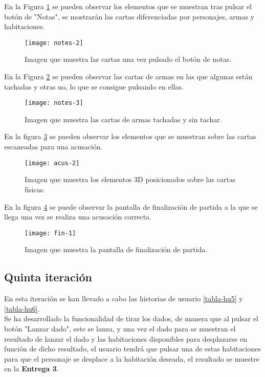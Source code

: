 \newpage

En la Figura \ref{figura-notas-1} se pueden observar los elementos que se muestran tras pulsar el botón de "Notas", se mostrarán las cartas diferenciadas por personajes, armas y habitaciones.

\begin{figure}[h]
  \centering
  \texttt{[image: notes-2]}
  \caption{Imagen que muestra las cartas una vez pulsado el botón de notas.}
  \label{figura-notas-1}
\end{figure}

\newpage

En la Figura \ref{figura-notas-2} se pueden observar las cartas de armas en las que algunas están tachadas y otras no, lo que se consigue pulsando en ellas.

\begin{figure}[h]
  \centering
  \texttt{[image: notes-3]}
  \caption{Imagen que muestra las cartas de armas tachadas y sin tachar.}
  \label{figura-notas-2}
\end{figure}

\newpage

En la figura \ref{figura-acus-1} se pueden observar los elementos que se muestran sobre las cartas escaneadas para una acusación.

\begin{figure}[h]
  \centering
  \texttt{[image: acus-2]}
  \caption{Imagen que muestra los elementos 3D posicionados sobre las cartas físicas.}
  \label{figura-acus-1}
\end{figure}

En la figura \ref{figura-fin-1} se puede observar la pantalla de finalización de partida a la que se llega una vez se realiza una acusación correcta.

\begin{figure}[h]
  \centering
  \texttt{[image: fin-1]}
  \caption{Imagen que muestra la pantalla de finalización de partida.}
  \label{figura-fin-1}
\end{figure}

\subsection{Quinta iteración}
En esta iteración se han llevado a cabo las historias de usuario \ref{tabla-hu5} y \ref{tabla-hu6}.\\

Se ha desarrollado la funcionalidad de tirar los dados, de manera que al pulsar el botón "Lanzar dado", este se lanza, y una vez el dado para se muestran el resultado de lanzar el dado y las habitaciones disponibles para desplazarse en función de dicho resultado, el usuario tendrá que pulsar una de estas habitaciones para que el personaje se desplace a la habitación deseada, el resultado se muestre en la \textbf{Entrega 3}.\\

